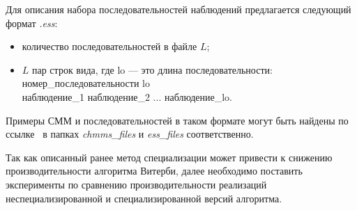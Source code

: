 Для описания набора последовательностей наблюдений 
предлагается следующий формат \emph{.ess}:
\begin{itemize}
	\item количество последовательностей в файле $L$;
	\item $L$ пар строк вида, где lo --- это длина последовательности:\\
	номер\_последовательности lo\\
	наблюдение\_1 наблюдение\_2 ... наблюдение\_lo.
\end{itemize}

Примеры СММ и последовательностей в таком формате могут быть 
найдены по ссылке~\cite{repo} в папках \emph{chmms\_files} и 
\emph{ess\_files} соответственно.

Так как описанный ранее метод специализации может привести 
к снижению производительности алгоритма Витерби, далее 
необходимо поставить эксперименты по сравнению 
производительности реализаций неспециализированной и 
специализированной версий алгоритма.
